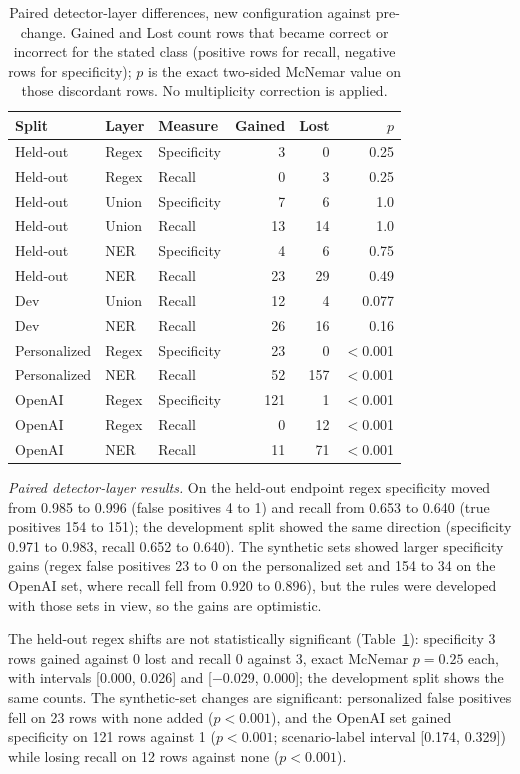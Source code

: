 \documentclass[sigconf]{acmart}
\theoremstyle{acmdefinition}\newtheorem{property}{Property}
\begin{document}
\begin{table}[!t]
\centering
\caption{Paired detector-layer differences, new configuration against pre-change. Gained and Lost count rows that became correct or incorrect for the stated class (positive rows for recall, negative rows for specificity); $p$ is the exact two-sided McNemar value on those discordant rows. No multiplicity correction is applied.}
\label{tab:detprec_paired}
\small
\setlength{\tabcolsep}{4pt}
\begin{tabular}{lllrrr}
\toprule
Split & Layer & Measure & Gained & Lost & $p$ \\
\midrule
Held-out & Regex & Specificity & 3 & 0 & 0.25 \\
Held-out & Regex & Recall & 0 & 3 & 0.25 \\
Held-out & Union & Specificity & 7 & 6 & 1.0 \\
Held-out & Union & Recall & 13 & 14 & 1.0 \\
Held-out & NER & Specificity & 4 & 6 & 0.75 \\
Held-out & NER & Recall & 23 & 29 & 0.49 \\
Dev & Union & Recall & 12 & 4 & 0.077 \\
Dev & NER & Recall & 26 & 16 & 0.16 \\
Personalized & Regex & Specificity & 23 & 0 & $<$0.001 \\
Personalized & NER & Recall & 52 & 157 & $<$0.001 \\
OpenAI & Regex & Specificity & 121 & 1 & $<$0.001 \\
OpenAI & Regex & Recall & 0 & 12 & $<$0.001 \\
OpenAI & NER & Recall & 11 & 71 & $<$0.001 \\
\bottomrule
\end{tabular}
\end{table}

\textit{Paired detector-layer results.} On the held-out endpoint regex specificity moved from 0.985 to 0.996 (false positives 4 to 1) and recall from 0.653 to 0.640 (true positives 154 to 151); the development split showed the same direction (specificity 0.971 to 0.983, recall 0.652 to 0.640). The synthetic sets showed larger specificity gains (regex false positives 23 to 0 on the personalized set and 154 to 34 on the OpenAI set, where recall fell from 0.920 to 0.896), but the rules were developed with those sets in view, so the gains are optimistic.

The held-out regex shifts are not statistically significant (Table~\ref{tab:detprec_paired}): specificity 3 rows gained against 0 lost and recall 0 against 3, exact McNemar $p=0.25$ each, with intervals [0.000, 0.026] and [$-$0.029, 0.000]; the development split shows the same counts. The synthetic-set changes are significant: personalized false positives fell on 23 rows with none added ($p<0.001$), and the OpenAI set gained specificity on 121 rows against 1 ($p<0.001$; scenario-label interval [0.174, 0.329]) while losing recall on 12 rows against none ($p<0.001$).
\end{document}
